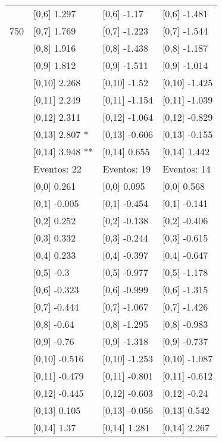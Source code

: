 \begin{table}
\begin{tabular}[t]{llll}
 & {}[0,6] 1.297 & {}[0,6] -1.17 & {}[0,6] -1.481\\
750 & {}[0,7] 1.769 & {}[0,7] -1.223 & {}[0,7] -1.544\\
\addlinespace
 & {}[0,8] 1.916 & {}[0,8] -1.438 & {}[0,8] -1.187\\
 & {}[0,9] 1.812 & {}[0,9] -1.511 & {}[0,9] -1.014\\
 & {}[0,10] 2.268 & {}[0,10] -1.52 & {}[0,10] -1.425\\
 & {}[0,11] 2.249 & {}[0,11] -1.154 & {}[0,11] -1.039\\
 & {}[0,12] 2.311 & {}[0,12] -1.064 & {}[0,12] -0.829\\
\addlinespace
 & {}[0,13] 2.807 * & {}[0,13] -0.606 & {}[0,13] -0.155\\
 & {}[0,14] 3.948 ** & {}[0,14] 0.655 & {}[0,14] 1.442\\
 & Eventos:  22 & Eventos:  19 & Eventos:  14\\
 & {}[0,0] 0.261 & {}[0,0] 0.095 & {}[0,0] 0.568\\
 & {}[0,1] -0.005 & {}[0,1] -0.454 & {}[0,1] -0.141\\
\addlinespace
 & {}[0,2] 0.252 & {}[0,2] -0.138 & {}[0,2] -0.406\\
 & {}[0,3] 0.332 & {}[0,3] -0.244 & {}[0,3] -0.615\\
 & {}[0,4] 0.233 & {}[0,4] -0.397 & {}[0,4] -0.647\\
 & {}[0,5] -0.3 & {}[0,5] -0.977 & {}[0,5] -1.178\\
 & {}[0,6] -0.323 & {}[0,6] -0.999 & {}[0,6] -1.315\\
\addlinespace
1000 & {}[0,7] -0.444 & {}[0,7] -1.067 & {}[0,7] -1.426\\
 & {}[0,8] -0.64 & {}[0,8] -1.295 & {}[0,8] -0.983\\
 & {}[0,9] -0.76 & {}[0,9] -1.318 & {}[0,9] -0.737\\
 & {}[0,10] -0.516 & {}[0,10] -1.253 & {}[0,10] -1.087\\
 & {}[0,11] -0.479 & {}[0,11] -0.801 & {}[0,11] -0.612\\
\addlinespace
 & {}[0,12] -0.445 & {}[0,12] -0.603 & {}[0,12] -0.24\\
 & {}[0,13] 0.105 & {}[0,13] -0.056 & {}[0,13] 0.542\\
 & {}[0,14] 1.37 & {}[0,14] 1.281 & {}[0,14] 2.267\\
\bottomrule
\end{tabular}
\end{table}

